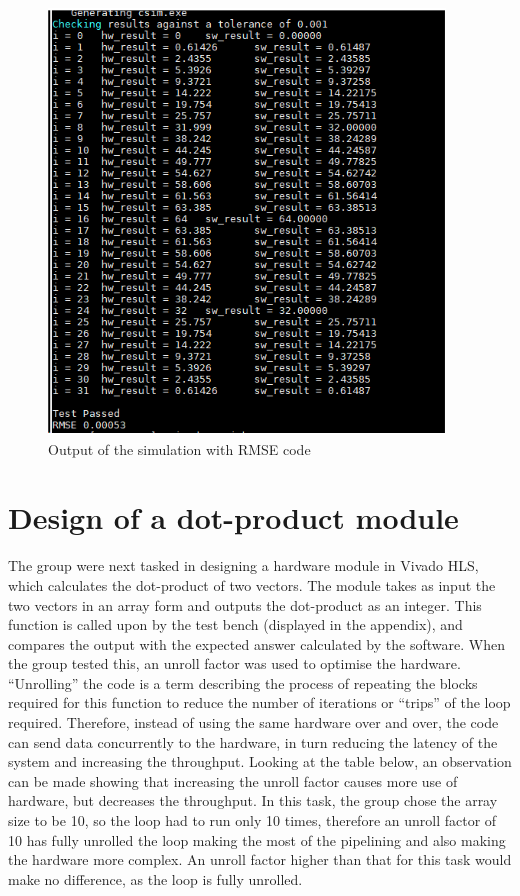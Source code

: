 \begin{figure}[h]
\centering
\includegraphics[scale=1]{RMSE}
\caption{Output of the simulation with RMSE code}
\label{RMSE}
\end{figure}




\section{ Design of a dot-product module}
The group were next tasked in designing a hardware module in Vivado HLS, which calculates the dot-product of two vectors. The module takes as input the two vectors in an array form and outputs the dot-product as an integer. This function is called upon by the test bench (displayed in the appendix), and compares the output with the expected answer calculated by the software. When the group tested this, an unroll factor was used to optimise the hardware. “Unrolling” the code is a term describing the process of repeating the blocks required for this function to reduce the number of iterations or “trips” of the loop required. \cite[p.321]{crockettelliottenderwitzstewart2014} Therefore, instead of using the same hardware over and over, the code can send data concurrently to the hardware, in turn reducing the latency of the system and increasing the throughput. Looking at the table below, an observation can be made showing that increasing the unroll factor causes more use of hardware, but decreases the throughput. In this task, the group chose the array size to be 10, so the loop had to run only 10 times, therefore an unroll factor of 10 has fully unrolled the loop making the most of the pipelining and also making the hardware more complex. An unroll factor higher than that for this task would make no difference, as the loop is fully unrolled.



